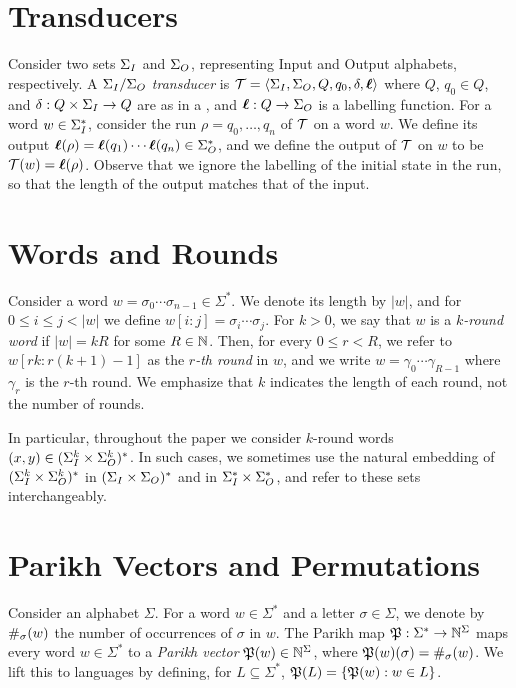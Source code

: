 \section*{Transducers}
Consider two sets $\Sigma_{I}$ and $\Sigma_{O}$, representing Input and Output alphabets, respectively. A \emph{$\Sigma_{I}/\Sigma_{O}$ transducer} is $\mathcal{T}=\left< \Sigma_{I},\Sigma_{O},Q,q_0,\delta,\boldsymbol{\ell}\right>$ where $Q$, $q_0\in Q$, and $\delta:Q\times \Sigma_{I}\to Q$ are as in a \DFA, and $\boldsymbol{\ell}:Q\to \Sigma_{O}$ is a labelling function. For a word $w\in \Sigma_{I}^*$, consider the run $\rho=q_0,\ldots,q_n$ of $\mathcal{T}$ on a word $w$. We define its output $\boldsymbol{\ell}(\rho)=\boldsymbol{\ell}(q_1)\cdots\boldsymbol{\ell}(q_n)\in \Sigma_{O}^*$, and we define the output of $\mathcal{T}$ on $w$ to be $\mathcal{T}(w)=\boldsymbol{\ell}(\rho)$. Observe that we ignore the labelling of the initial state in the run, so that the length of the output matches that of the input.


\section*{Words and Rounds}
Consider a word $w=\sigma_0\cdots \sigma_{n-1}\in \Sigma^*$. We denote its length by $|w|$, and for $0\le i\le j< |w|$ we define $w[i:j]=\sigma_i\cdots \sigma_j$. 
For $k>0$, we say that $w$ is a \emph{$k$-round word} if $|w|=kR$ for some $R\in \mathbb{N}$. Then, for every $0\le r<R$, we refer to $w[rk:r(k+1)-1]$ as the \emph{$r$-th round} in $w$, and we write $w=\gamma_0\cdots \gamma_{R-1}$ where $\gamma_r$ is the $r$-th round. We emphasize that $k$ indicates the length of each round, not the number of rounds.

In particular, throughout the paper we consider $k$-round words $(x,y)\in (\Sigma_{I}^k\times \Sigma_{O}^k)^*$. In such cases, we sometimes use the natural embedding of $(\Sigma_{I}^k\times \Sigma_{O}^k)^*$ in $(\Sigma_{I}\times \Sigma_{O})^*$ and in $\Sigma_{I}^*\times \Sigma_{O}^*$, and refer to these sets interchangeably.

\section*{Parikh Vectors and Permutations}
Consider an alphabet $\Sigma$. For a word $w\in \Sigma^*$ and a letter $\sigma\in \Sigma$, we denote by $\#_\sigma(w)$ the number of occurrences of $\sigma$ in $w$. 
The Parikh map
$\mathfrak{P}:\Sigma^*\to \mathbb{N}^\Sigma$ maps every word $w\in \Sigma^*$ to a \emph{Parikh vector} $\mathfrak{P}(w)\in \mathbb{N}^\Sigma$, where $\mathfrak{P}(w)(\sigma)=\#_\sigma(w)$. We lift this to languages by defining, for $L\subseteq \Sigma^*$, $\mathfrak{P}(L)=\{\mathfrak{P}(w):w\in L\}$. 

